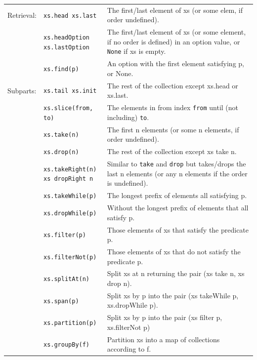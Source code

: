 \documentclass[article, a5paper]{memoir}
\begin{document}
{\begin{tabular}{@{}l p{3.6cm} p{6.8cm}}
  Retrieval: & \texttt{xs.head xs.last} &  	The first/last element of xs (or some elem, if order undefined).\\ \cline{2-3}
      & \texttt{xs.headOption \newline xs.lastOption} & The first/last element of xs (or some element, if no order is defined) in an option value, or \texttt{None} if xs is empty.\\ \cline{2-3}
      & \texttt{xs.find(p)} & An option with the first element satisfying p, or None.\\ \cline{1-3}


  Subparts: & \texttt{xs.tail xs.init} & The rest of the collection except xs.head or xs.last.\\ \cline{2-3}
      & \texttt{xs.slice(from, to)} & The elements in from index \texttt{from} until (not including) \texttt{to}.\\ \cline{2-3}
      & \texttt{xs.take(n)} & The first n elements (or some n elements, if order undefined).\\ \cline{2-3}
      & \texttt{xs.drop(n)} & The rest of the collection except xs take n.\\ \cline{2-3}
      & \texttt{xs.takeRight(n) \newline xs dropRight n} & Similar to \texttt{take} and \texttt{drop}  but takes/drops the last n elements (or any n elements if the order is undefined).\\   \cline{1-3}
      & \texttt{xs.takeWhile(p)} & The longest prefix of elements all satisfying p.\\ \cline{2-3}
      & \texttt{xs.dropWhile(p)} & Without the longest prefix of elements that all satisfy p.\\ \cline{2-3}
      & \texttt{xs.filter(p)} & Those elements of xs that satisfy the predicate p. \\ \cline{2-3}
      & \texttt{xs.filterNot(p)} & Those elements of xs that do not satisfy the predicate p.\\ \cline{2-3}
      & \texttt{xs.splitAt(n)} &  	Split xs at n returning the pair (xs take n, xs drop n).\\ \cline{2-3}
      & \texttt{xs.span(p)} & Split xs by p into the pair (xs takeWhile p, xs.dropWhile p).\\ \cline{2-3}
      & \texttt{xs.partition(p)} & Split xs by p into the pair (xs filter p, xs.filterNot p)\\ \cline{2-3}
      & \texttt{xs.groupBy(f)} & Partition xs into a map of collections according to f.\\ \cline{1-3}



\end{tabular}}
\end{document}
